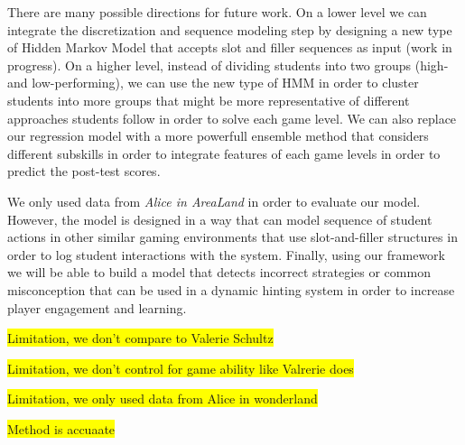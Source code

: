 \documentclass{sigchi}
\newcommand{\hl}[1]{\colorbox{yellow}{#1}}
\begin{document}
There are many possible directions for future work. On a lower level we can integrate the discretization and sequence modeling step by designing a new type of Hidden Markov Model that accepts slot and filler sequences as input (work in progress). On a higher level, instead of dividing students into two groups (high- and low-performing), we can use the new type of HMM in order to cluster students into more groups that might be  more representative of different approaches students follow in order to solve each game level. We can also replace our regression model with a more powerfull ensemble method that considers different subskills in order to integrate features of each game levels in order to predict the post-test scores.

We only used data from \textit{Alice in AreaLand} in order to evaluate our model. However, the model is designed in a way that can model sequence of student actions in other similar gaming environments that use slot-and-filler structures in order to log student interactions with the system. Finally, using our framework we will be able to build a model that detects incorrect strategies or common misconception that can be used in a dynamic hinting system in order to increase player engagement and learning. 

\hl{Limitation, we don't compare to Valerie Schultz}

\hl{Limitation, we don't control for game ability like Valrerie does}

\hl{Limitation, we only used data from Alice in wonderland}

\hl{Method is accuaate}




\end{document}
